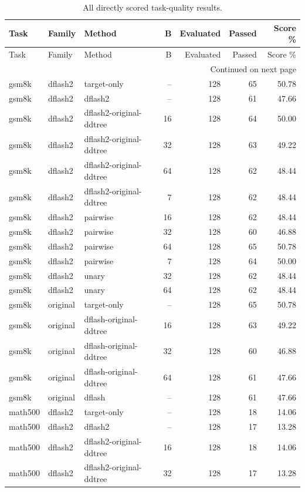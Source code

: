 \begin{longtable}{lllrrrr}
\caption{All directly scored task-quality results.}\label{tab:all-quality}\\
\toprule
Task & Family & Method & B & Evaluated & Passed & Score \% \\
\midrule
\endfirsthead
\toprule
Task & Family & Method & B & Evaluated & Passed & Score \% \\
\midrule
\endhead
\midrule
\multicolumn{7}{r}{Continued on next page}\\
\endfoot
\bottomrule
\endlastfoot
gsm8k & dflash2 & target-only & -- & 128 & 65 & 50.78 \\
gsm8k & dflash2 & dflash2 & -- & 128 & 61 & 47.66 \\
gsm8k & dflash2 & dflash2-original-ddtree & 16 & 128 & 64 & 50.00 \\
gsm8k & dflash2 & dflash2-original-ddtree & 32 & 128 & 63 & 49.22 \\
gsm8k & dflash2 & dflash2-original-ddtree & 64 & 128 & 62 & 48.44 \\
gsm8k & dflash2 & dflash2-original-ddtree & 7 & 128 & 62 & 48.44 \\
gsm8k & dflash2 & pairwise & 16 & 128 & 62 & 48.44 \\
gsm8k & dflash2 & pairwise & 32 & 128 & 60 & 46.88 \\
gsm8k & dflash2 & pairwise & 64 & 128 & 65 & 50.78 \\
gsm8k & dflash2 & pairwise & 7 & 128 & 64 & 50.00 \\
gsm8k & dflash2 & unary & 32 & 128 & 62 & 48.44 \\
gsm8k & dflash2 & unary & 64 & 128 & 62 & 48.44 \\
gsm8k & original & target-only & -- & 128 & 65 & 50.78 \\
gsm8k & original & dflash-original-ddtree & 16 & 128 & 63 & 49.22 \\
gsm8k & original & dflash-original-ddtree & 32 & 128 & 60 & 46.88 \\
gsm8k & original & dflash-original-ddtree & 64 & 128 & 61 & 47.66 \\
gsm8k & original & dflash & -- & 128 & 61 & 47.66 \\
math500 & dflash2 & target-only & -- & 128 & 18 & 14.06 \\
math500 & dflash2 & dflash2 & -- & 128 & 17 & 13.28 \\
math500 & dflash2 & dflash2-original-ddtree & 16 & 128 & 18 & 14.06 \\
math500 & dflash2 & dflash2-original-ddtree & 32 & 128 & 17 & 13.28 \\

\end{longtable}
